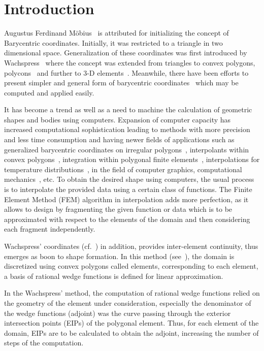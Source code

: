 \section{Introduction}
Augustus Ferdinand M\"obius~\cite{mo} is attributed for initializing the concept
of Barycentric coordinates. Initially, it was restricted to a triangle in two
dimensional space. Generalization of these coordinates was first introduced by
Wachspress~\cite{wach71} where the concept was extended from triangles to convex
polygons, polycons~\cite{wach73} and further to 3-D elements~\cite{warren, wach,
wachs}. Meanwhile, there have been efforts to present simpler and general form
of barycentric coordinates~\cite{1,2,3,4,5,6} which may be computed and applied
easily.

It has become a trend as well as a need to machine the calculation of geometric
shapes and bodies using computers. Expansion of computer capacity has increased
computational sophistication leading to methods with more precision and less
time consumption and having newer fields of applications such as generalized
barycentric coordinates on irregular polygons~\cite{7}, interpolants within
convex polygons~\cite{das}, integration within polygonal finite
elements~\cite{9}, interpolations for temperature distributions~\cite{10}, in
the field of computer graphics, computational mechanics~\cite{11}, etc. To
obtain the desired shape using computers, the usual process is to interpolate
the provided data using a certain class of functions. The Finite Element Method
(FEM) algorithm in interpolation adds more perfection, as it allows to design by
fragmenting the given function or data which is to be approximated with respect
to the elements of the domain and then considering each fragment independently.

Wachspress' coordinates (cf.~\cite{wach}) in addition, provides inter-element
continuity, thus emerges as boon to shape formation. In this method
(see~\cite{wachs}), the domain is discretized using convex polygons called
elements, corresponding to each element, a basis of rational wedge functions is
defined for linear approximation.

In the Wachspress\rq{} method, the computation of rational wedge functions
relied on the geometry of the element under consideration, especially the
denominator of the wedge functions (adjoint) was the curve passing through the
exterior intersection points (EIPs) of the polygonal element. Thus, for each
element of the domain, EIPs are to be calculated to obtain the adjoint,
increasing the number of steps of the computation.

